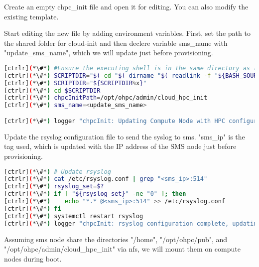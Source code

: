 	Create an empty chpc\_init file and open it for editing. You can also modify the existing template. 

	Start editing the new file by adding environment variables. First, set the path to the shared folder for cloud-init and then declere variable sms\_name with "update\_sms\_name", which we will update just before provisioning.


\begin{lstlisting}[language=bash,keywords={}]
[ctrlr](*\#*) #Ensure the executing shell is in the same directory as the script.
[ctrlr](*\#*) SCRIPTDIR="$( cd "$( dirname "$( readlink -f "${BASH_SOURCE[0]}" )" )" && pwd -P && echo x)"
[ctrlr](*\#*) SCRIPTDIR="${SCRIPTDIR%x}"
[ctrlr](*\#*) cd $SCRIPTDIR
[ctrlr](*\#*) chpcInitPath=/opt/ohpc/admin/cloud_hpc_init
[ctrlr](*\#*) sms_name=<update_sms_name>

[ctrlr](*\#*) logger "chpcInit: Updating Compute Node with HPC configuration"
\end{lstlisting}

	Update the rsyslog configuration file to send the syslog to sms. "sms\_ip" is the tag used, which is updated with the IP address of the SMS node just before provisioning.

\begin{lstlisting}[language=bash,keywords={}]
[ctrlr](*\#*) # Update rsyslog
[ctrlr](*\#*) cat /etc/rsyslog.conf | grep "<sms_ip>:514"
[ctrlr](*\#*) rsyslog_set=$?
[ctrlr](*\#*) if [ "${rsyslog_set}" -ne "0" ]; then
[ctrlr](*\#*)    echo "*.* @<sms_ip>:514" >> /etc/rsyslog.conf
[ctrlr](*\#*) fi
[ctrlr](*\#*) systemctl restart rsyslog
[ctrlr](*\#*) logger "chpcInit: rsyslog configuration complete, updating remaining HPC configuration"
\end{lstlisting}

	Assuming sms node share the directories "/home", "/opt/ohpc/pub", and "/opt/ohpc/admin/cloud\_hpc\_init" via nfs, we will mount them on compute nodes during boot.

